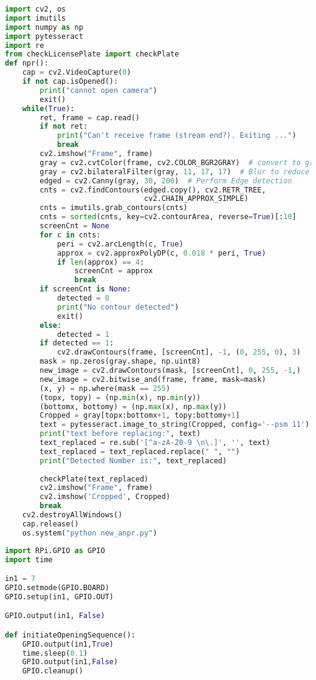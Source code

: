     \begin{lstlisting}[language=Python, caption=ANPR code, label=lst:impl:ANPR]
import cv2, os
import imutils
import numpy as np
import pytesseract
import re
from checkLicensePlate import checkPlate
def npr():
    cap = cv2.VideoCapture(0)
    if not cap.isOpened():
        print("cannot open camera")
        exit()
    while(True):
        ret, frame = cap.read()
        if not ret:
            print("Can't receive frame (stream end?). Exiting ...")
            break
        cv2.imshow("Frame", frame)
        gray = cv2.cvtColor(frame, cv2.COLOR_BGR2GRAY)  # convert to grey scale
        gray = cv2.bilateralFilter(gray, 11, 17, 17)  # Blur to reduce noise
        edged = cv2.Canny(gray, 30, 200)  # Perform Edge detection
        cnts = cv2.findContours(edged.copy(), cv2.RETR_TREE,
                                cv2.CHAIN_APPROX_SIMPLE)
        cnts = imutils.grab_contours(cnts)
        cnts = sorted(cnts, key=cv2.contourArea, reverse=True)[:10]
        screenCnt = None
        for c in cnts:
            peri = cv2.arcLength(c, True)
            approx = cv2.approxPolyDP(c, 0.018 * peri, True)
            if len(approx) == 4:
                screenCnt = approx
                break
        if screenCnt is None:
            detected = 0
            print("No contour detected")
            exit()
        else:
            detected = 1
        if detected == 1:
            cv2.drawContours(frame, [screenCnt], -1, (0, 255, 0), 3)
        mask = np.zeros(gray.shape, np.uint8)
        new_image = cv2.drawContours(mask, [screenCnt], 0, 255, -1,)
        new_image = cv2.bitwise_and(frame, frame, mask=mask)
        (x, y) = np.where(mask == 255)
        (topx, topy) = (np.min(x), np.min(y))
        (bottomx, bottomy) = (np.max(x), np.max(y))
        Cropped = gray[topx:bottomx+1, topy:bottomy+1]
        text = pytesseract.image_to_string(Cropped, config='--psm 11')
        print("text before replacing:", text)
        text_replaced = re.sub('[^a-zA-Z0-9 \n\.]', '', text)
        text_replaced = text_replaced.replace(" ", "")
        print("Detected Number is:", text_replaced)
        
        checkPlate(text_replaced)
        cv2.imshow("Frame", frame)
        cv2.imshow('Cropped', Cropped)
        break
    cv2.destroyAllWindows()
    cap.release()
    os.system("python new_anpr.py")
    \end{lstlisting}

    \begin{lstlisting}[language=Python, caption=Relais code, label=lst:impl:relais]
        import RPi.GPIO as GPIO
import time

in1 = 7
GPIO.setmode(GPIO.BOARD)
GPIO.setup(in1, GPIO.OUT)

GPIO.output(in1, False)

def initiateOpeningSequence():
    GPIO.output(in1,True)
    time.sleep(0.1)
    GPIO.output(in1,False)
    GPIO.cleanup()
    \end{lstlisting}